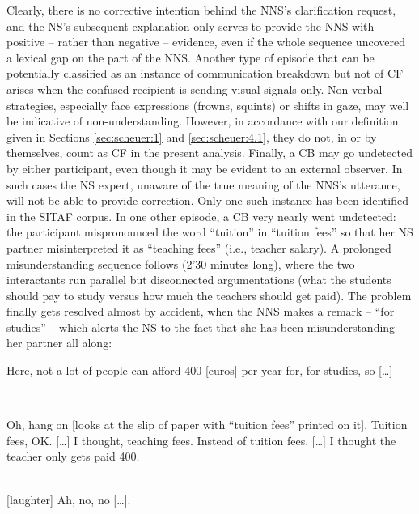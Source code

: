 \documentclass[output=paper,colorlinks,citecolor=brown,modfonts,nonflat]{../langscibook}
\begin{document}
Clearly, there is no corrective intention behind the NNS’s clarification request, and the NS’s subsequent explanation only serves to provide the NNS with positive – rather than negative – evidence, even if the whole sequence uncovered a lexical gap on the part of the NNS. Another type of episode that can be potentially classified as an instance of communication breakdown but not of CF arises when the confused recipient is sending visual signals only. Non-verbal strategies, especially face expressions (frowns, squints) or shifts in gaze, may well be indicative of non-understanding. However, in accordance with our definition given in Sections \ref{sec:scheuer:1} and \ref{sec:scheuer:4.1}, they do not, in or by themselves, count as CF in the present analysis. Finally, a CB may go undetected by either participant, even though it may be evident to an external observer. In such cases the NS expert, unaware of the true meaning of the NNS’s utterance, will not be able to provide correction. Only one such instance has been identified in the SITAF corpus. In one other episode, a CB very nearly went undetected: the  participant mispronounced the word “tuition” in “tuition fees” so that her NS partner misinterpreted it as “teaching fees” (i.e., teacher salary). A prolonged misunderstanding sequence follows (2’30 minutes long), where the two interactants run parallel but disconnected argumentations (what the students should pay to study versus how much the teachers should get paid). The problem finally gets resolved almost by accident, when the NNS makes a remark – “for studies” – which alerts the NS to the fact that she has been misunderstanding her partner all along:


\ea\label{ex:scheuer:14}
{\NNS} \parbox[t]{10cm}{ {Here,} {not} {a} {lot} {of} {people} {can} {afford} {400} [euros] {per} {year} {for,} {for} {studies,} {so} {[…]}}\\\smallskip
{\NS} \parbox[t]{10cm}{{Oh,} {hang} {on} [looks at the slip of paper with “tuition fees” printed on it]. {Tuition} {fees,} {OK.} {[…]} {I} {thought,} {teaching} {fees.} {Instead} {of} {tuition} {fees.} {[…]} {I} {thought} {the} {teacher} {only} {gets} {paid} {400.}}\\\smallskip
{\NNS} [laughter] {Ah,} {no,} {no} {[…].}
\z
\end{document}
